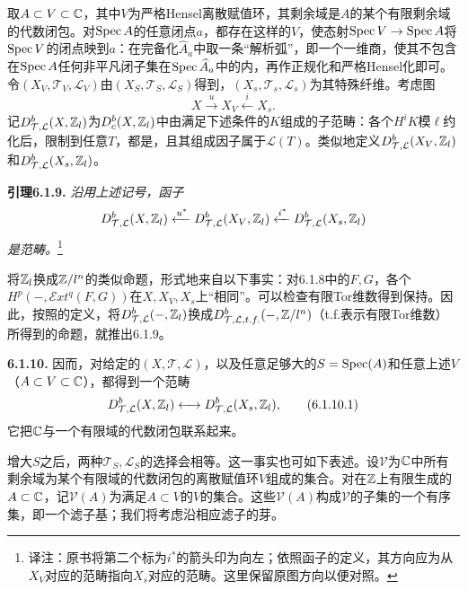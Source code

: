 取$A\subset V\subset\mathbb C$，其中$V$为严格Hensel离散赋值环，其剩余域是$A$的某个有限剩余域的代数闭包。对$\operatorname{Spec} A$的任意闭点$a$，都存在这样的$V$，使态射$\operatorname{Spec} V\to\operatorname{Spec} A$将$\operatorname{Spec} V$的闭点映到$a$：在完备化$\widehat A_a$中取一条“解析弧”，即一个一维商，使其不包含在$\operatorname{Spec} A$任何非平凡闭子集在$\operatorname{Spec}\widehat A_a$中的内，再作正规化和严格Hensel化即可。令$(X_V,\mathcal T_V,\mathcal L_V)$由$(X_S,\mathcal T_S,\mathcal L_S)$得到，$(X_s,\mathcal T_s,\mathcal L_s)$为其特殊纤维。考虑图
\[
X\xrightarrow{u}X_V\xleftarrow{i}X_s.
\]
记$D_{\mathcal T,\mathcal L}^b(X,\mathbb Z_l)$为$D_c^b(X,\mathbb Z_l)$中由满足下述条件的$K$组成的子范畴：各个$H^iK$模$\ell$约化后，限制到任意$T$，都是，且其组成因子属于$\mathcal L(T)$。类似地定义$D_{\mathcal T,\mathcal L}^b(X_V,\mathbb Z_l)$和$D_{\mathcal T,\mathcal L}^b(X_s,\mathbb Z_l)$。

\par\medskip\noindent\textbf{引理6.1.9.} \emph{沿用上述记号，函子}
\[
D_{\mathcal T,\mathcal L}^b(X,\mathbb Z_l)
\xleftarrow{u^*}D_{\mathcal T,\mathcal L}^b(X_V,\mathbb Z_l)
\xleftarrow{i^*}D_{\mathcal T,\mathcal L}^b(X_s,\mathbb Z_l)
\]
\emph{是范畴。}\footnote{译注：原书将第二个标为$i^*$的箭头印为向左；依照函子的定义，其方向应为从$X_V$对应的范畴指向$X_s$对应的范畴。这里保留原图方向以便对照。}

将$\mathbb Z_l$换成$\mathbb Z/l^n$的类似命题，形式地来自以下事实：对6.1.8中的$F,G$，各个$H^p(-,\mathcal Ext^q(F,G))$在$X,X_V,X_s$上“相同”。可以检查有限Tor维数得到保持。因此，按照的定义，将$D_{\mathcal T,\mathcal L}^b(-,\mathbb Z_l)$换成$D_{\mathcal T,\mathcal L,t.f.}^b(-,\mathbb Z/l^n)$（t.f.表示有限Tor维数）所得到的命题，就推出6.1.9。

\par\medskip\noindent\textbf{6.1.10.} 因而，对给定的$(X,\mathcal T,\mathcal L)$，以及任意足够大的$S=\operatorname{Spec}(A)$和任意上述$V$（$A\subset V\subset\mathbb C$），都得到一个范畴
\begin{equation*}
D_{\mathcal T,\mathcal L}^b(X,\mathbb Z_l)
\longleftrightarrow D_{\mathcal T,\mathcal L}^b(X_s,\mathbb Z_l),
\tag{6.1.10.1}
\end{equation*}
它把$\mathbb C$与一个有限域的代数闭包联系起来。

增大$S$之后，两种$\mathcal T_S,\mathcal L_S$的选择会相等。这一事实也可如下表述。设$\mathcal V$为$\mathbb C$中所有剩余域为某个有限域的代数闭包的离散赋值环$V$组成的集合。对在$\mathbb Z$上有限生成的$A\subset\mathbb C$，记$\mathcal V(A)$为满足$A\subset V$的$V$的集合。这些$\mathcal V(A)$构成$\mathcal V$的子集的一个有序集，即一个滤子基；我们将考虑沿相应滤子的芽。

